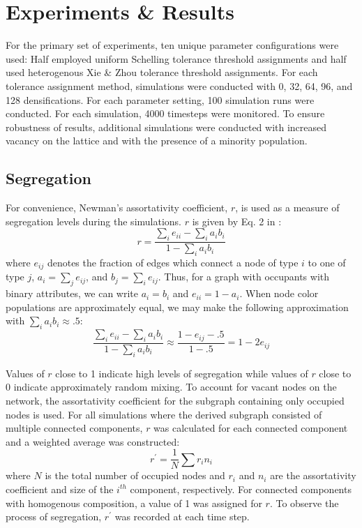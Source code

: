 \documentclass[a4paper]{article}
\begin{document}
\section{Experiments \& Results}
For the primary set of experiments, ten unique parameter configurations were used: Half employed uniform Schelling \cite{schelling1971dynamic} tolerance threshold assignments and half used heterogenous Xie \& Zhou \cite{xie2012modeling} tolerance threshold assignments. For each tolerance assignment method, simulations were conducted with 0, 32, 64, 96, and 128 densifications. For each parameter setting, 100 simulation runs were conducted. For each simulation, 4000 timesteps were monitored. To ensure robustness of results, additional simulations were conducted with increased vacancy on the lattice and with the presence of a minority population.

\subsection{Segregation}
For convenience, Newman’s \cite{PhysRevE.67.026126} assortativity coefficient, $r$, is used as a measure of segregation levels during the simulations. $r$ is given by Eq. 2 in \cite{PhysRevE.67.026126}:
\begin{equation}
    r=\frac{\sum_{i} e_{ii}-\sum_{i}{a_ib_i}}{1-\sum_{i}{a_ib_i}}
\end{equation}
where $e_{ij}$ denotes the fraction of edges which connect a node of type $i$ to one of type $j$, $a_i=\sum_{j} e_{ij}$, and $b_j=\sum_{i} e_{ij}$. Thus, for a graph with occupants with binary attributes, we can write $a_i=b_i$ and $e_{ii}=1-a_i$. When node color populations are approximately equal, we may make the following approximation with $\sum_{i}{a_ib_i}\approx.5$:
\begin{equation}
    \frac{\sum_{i} e_{ii}-\sum_{i}{a_ib_i}}{1-\sum_{i}{a_ib_i}}\approx\frac{1-e_{ij}-.5}{1-.5}=1-2e_{ij}
\end{equation}

Values of $r$ close to 1 indicate high levels of segregation while values of $r$ close to 0 indicate approximately random mixing.  To account for vacant nodes on the network, the assortativity coefficient for the subgraph containing only occupied nodes is used.  For all simulations where the derived subgraph consisted of multiple connected components, $r$ was calculated for each connected component and a weighted average was constructed:
\begin{equation}
    r^\prime=\frac{1}{N}\sum r_in_i
\end{equation}
where $N$ is the total number of occupied nodes and $r_i$ and $n_i$ are the assortativity coefficient and size of the $i^{th}$ component, respectively. For connected components with homogenous composition, a value of 1 was assigned for $r$. To observe the process of segregation, $r^\prime$ was recorded at each time step.
\end{document}
